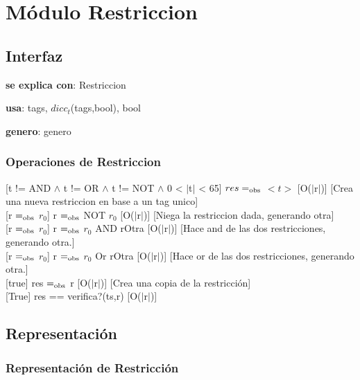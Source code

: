 \section{M\'odulo Restriccion}
\subsection{Interfaz}

\textbf{se explica con}: Restriccion

  \textbf{usa}: tags, $dicc_t$(tags,bool), bool
  
  \textbf{genero}: genero
  
\subsubsection{Operaciones de Restriccion}

  [t != AND $\wedge$ t != OR $\wedge$ t != NOT $\wedge$ 0 < $|$t$|$ < 65]
  {$res =_{\mathrm{obs}}$ $<t>$}
  [O($|$r$|$)]
  [Crea una nueva restriccion en base a un tag unico] \\

  [r $=_{\mathrm{obs}}$ $r_0$]
  {r $=_{\mathrm{obs}}$ NOT $r_0$}
  [O($|$r$|$)]
  [Niega la restriccion dada, generando otra] \\

  [r $=_{\mathrm{obs}}$ $r_0$]
  {r $=_{\mathrm{obs}}$ $r_0$ AND rOtra}
  [O($|$r$|$)]
  [Hace and de las dos restricciones, generando otra.] \\ 

  [r $=_{\mathrm{obs}}$ $r_0$]
  {r $=_{\mathrm{obs}}$ $r_0$ Or rOtra}
  [O($|$r$|$)]
  [Hace or de las dos restricciones, generando otra.] \\

  [true]
  {res $=_{\mathrm{obs}}$ r}
  [O($|$r$|$)]
  [Crea una copia de la restricci\'on] \\

  [True]
  {res == verifica?(ts,r)}
  [O($|$r$|$)]

\subsection{Representaci\'on}
\subsubsection{Representaci\'on de Restricci\'on}

